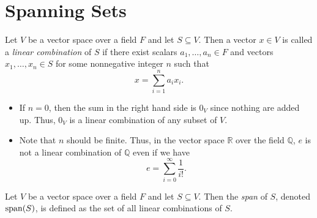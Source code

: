 \section{Spanning Sets}
\begin{definition}\label{def:linear-combination}
  Let $V$ be a vector space over a field $F$ and let $S \subseteq V$.
  Then a vector $x \in V$ is called a \emph{linear combination} of $S$ if
  there exist scalars $a_1, \dots, a_n \in F$ and vectors
  $x_1, \dots, x_n \in S$ for some nonnegative integer $n$ such that
  \begin{equation*}
    x = \sum_{i=1}^n a_ix_i.
  \end{equation*}
\end{definition}
\begin{remark}
  \leavevmode
  \begin{itemize}
    \item If $n = 0$, then the sum in the right hand side is $0_V$ since
      nothing are added up.
      Thus, $0_V$ is a linear combination of any subset of $V$.
    \item Note that $n$ should be finite. Thus, in the vector space
      $\mathbb{R}$ over the field $\mathbb{Q}$, $e$ is not a linear combination
      of $\mathbb{Q}$ even if we have
      \begin{equation*}
        e = \sum_{i=0}^\infty \frac{1}{i!}.
      \end{equation*}
  \end{itemize}
\end{remark}

\begin{definition}\label{def:span}
  Let $V$ be a vector space over a field $F$ and let $S \subseteq V$.
  Then the \emph{span} of $S$, denoted $\operatorname{span}(S)$, is defined as the
  set of all linear combinations of $S$.
\end{definition}

